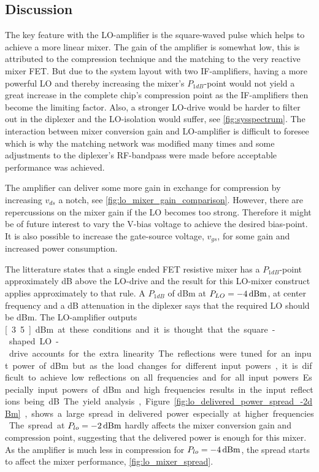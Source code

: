 	\subsection{Discussion}
		The key feature with the LO-amplifier is the square-waved pulse which helps to achieve a more linear mixer. The gain of the amplifier is somewhat low, this is attributed to the compression technique and the matching to the very reactive mixer FET. But due to the system layout with two IF-amplifiers, having a more powerful LO and thereby increasing the mixer's $P_{1dB}$-point would not yield a great increase in the complete chip's compression point as the IF-amplifiers then become the limiting factor. Also, a stronger LO-drive would be harder to filter out in the diplexer and the LO-isolation would suffer, see \autoref{fig:sysspectrum}. The interaction between mixer conversion gain and LO-amplifier is difficult to foresee which is why the matching network was modified many times and some adjustments to the diplexer's RF-bandpass were made before acceptable performance was achieved.

		The amplifier can deliver some more gain in exchange for compression by increasing $v_{ds}$ a notch, see \autoref{fig:lo_mixer_gain_comparison}. However, there are repercussions on the mixer gain if the LO becomes too strong. Therefore it might be of future interest to vary the \unit[5]{V}-bias voltage to achieve the desired bias-point. It is also possible to increase the gate-source voltage, $v_{gs}$, for some gain and increased power consumption.

		The litterature states that a single ended FET resistive mixer has a $P_{1dB}$-point approximately \unit[4]{dB} above the LO-drive\autocite{radmanesh2002state} and the result for this LO-mixer construct applies approximately to that rule. A $P_{1dB}$ of \unit[12]{dBm} at $P_{LO}=\unit[-4]{dBm}$, at center frequency and a \unit[3]{dB} attenuation in the diplexer says that the required LO should be \unit[5]{dBm}. The LO-amplifier outputs \unit[3.5]{dBm} at these conditions and it is thought that the square-shaped LO-drive accounts for the extra linearity.

		The reflections were tuned for an input power of \unit[-2]{dBm} but as the load changes for different input powers, it is difficult to achieve low reflections on all frequencies and for all input powers. Especially input powers of \unit[-4]{dBm} and high frequencies results in the input reflections being \unit[-10]{dB}.

		The yield analysis, Figure \autoref{fig:lo_delivered_power_spread_-2dBm}, shows a large spread in delivered power especially at higher frequencies.  The spread at $P_{lo}=\unit[-2]{dBm}$ hardly affects the mixer conversion gain and compression point, suggesting that the delivered power is enough for this mixer. As the amplifier is much less in compression for $P_{lo}=\unit[-4]{dBm}$, the spread starts to affect the mixer performance, \autoref{fig:lo_mixer_spread}.

